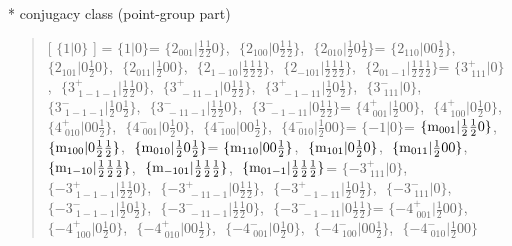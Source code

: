 \documentclass[fleqn,10pt,landscape]{jsarticle}
\begin{document}
* conjugacy class (point-group part)
\begin{quote}
[ $\{1|0\}$ ] = \quad $\{1|0\}$ = \quad $\{2{}_{001}|\frac{1}{2} \frac{1}{2} 0\}$,\,\, $\{2{}_{100}|0 \frac{1}{2} \frac{1}{2}\}$,\,\, $\{2{}_{010}|\frac{1}{2} 0 \frac{1}{2}\}$\newline[ $\{2{}_{110}|0 0 \frac{1}{2}\}$ ] = \quad $\{2{}_{110}|0 0 \frac{1}{2}\}$,\,\, $\{2{}_{101}|0 \frac{1}{2} 0\}$,\,\, $\{2{}_{011}|\frac{1}{2} 0 0\}$,\,\, $\{2{}_{1-10}|\frac{1}{2} \frac{1}{2} \frac{1}{2}\}$,\,\, $\{2{}_{-101}|\frac{1}{2} \frac{1}{2} \frac{1}{2}\}$,\,\, $\{2{}_{01-1}|\frac{1}{2} \frac{1}{2} \frac{1}{2}\}$\newline[ $\{3^{+}_{\,\,111}|0\}$ ] = \quad $\{3^{+}_{\,\,111}|0\}$,\,\, $\{3^{+}_{\,\,1-1-1}|\frac{1}{2} \frac{1}{2} 0\}$,\,\, $\{3^{+}_{\,\,-11-1}|0 \frac{1}{2} \frac{1}{2}\}$,\,\, $\{3^{+}_{\,\,-1-11}|\frac{1}{2} 0 \frac{1}{2}\}$,\,\, $\{3^{-}_{\,\,111}|0\}$,\,\, $\{3^{-}_{\,\,1-1-1}|\frac{1}{2} 0 \frac{1}{2}\}$,\,\, $\{3^{-}_{\,\,-11-1}|\frac{1}{2} \frac{1}{2} 0\}$,\,\, $\{3^{-}_{\,\,-1-11}|0 \frac{1}{2} \frac{1}{2}\}$\newline[ $\{4^{+}_{\,\,001}|\frac{1}{2} 0 0\}$ ] = \quad $\{4^{+}_{\,\,001}|\frac{1}{2} 0 0\}$,\,\, $\{4^{+}_{\,\,100}|0 \frac{1}{2} 0\}$,\,\, $\{4^{+}_{\,\,010}|0 0 \frac{1}{2}\}$,\,\, $\{4^{-}_{\,\,001}|0 \frac{1}{2} 0\}$,\,\, $\{4^{-}_{\,\,100}|0 0 \frac{1}{2}\}$,\,\, $\{4^{-}_{\,\,010}|\frac{1}{2} 0 0\}$\newline[ $\{-1|0\}$ ] = \quad $\{-1|0\}$ = \quad $\{{\rm m}_{001}|\frac{1}{2} \frac{1}{2} 0\}$,\,\, $\{{\rm m}_{100}|0 \frac{1}{2} \frac{1}{2}\}$,\,\, $\{{\rm m}_{010}|\frac{1}{2} 0 \frac{1}{2}\}$\newline[ $\{{\rm m}_{110}|0 0 \frac{1}{2}\}$ ] = \quad $\{{\rm m}_{110}|0 0 \frac{1}{2}\}$,\,\, $\{{\rm m}_{101}|0 \frac{1}{2} 0\}$,\,\, $\{{\rm m}_{011}|\frac{1}{2} 0 0\}$,\,\, $\{{\rm m}_{1-10}|\frac{1}{2} \frac{1}{2} \frac{1}{2}\}$,\,\, $\{{\rm m}_{-101}|\frac{1}{2} \frac{1}{2} \frac{1}{2}\}$,\,\, $\{{\rm m}_{01-1}|\frac{1}{2} \frac{1}{2} \frac{1}{2}\}$\newline[ $\{-3^{+}_{\,\,111}|0\}$ ] = \quad $\{-3^{+}_{\,\,111}|0\}$,\,\, $\{-3^{+}_{\,\,1-1-1}|\frac{1}{2} \frac{1}{2} 0\}$,\,\, $\{-3^{+}_{\,\,-11-1}|0 \frac{1}{2} \frac{1}{2}\}$,\,\, $\{-3^{+}_{\,\,-1-11}|\frac{1}{2} 0 \frac{1}{2}\}$,\,\, $\{-3^{-}_{\,\,111}|0\}$,\,\, $\{-3^{-}_{\,\,1-1-1}|\frac{1}{2} 0 \frac{1}{2}\}$,\,\, $\{-3^{-}_{\,\,-11-1}|\frac{1}{2} \frac{1}{2} 0\}$,\,\, $\{-3^{-}_{\,\,-1-11}|0 \frac{1}{2} \frac{1}{2}\}$\newline[ $\{-4^{+}_{\,\,001}|\frac{1}{2} 0 0\}$ ] = \quad $\{-4^{+}_{\,\,001}|\frac{1}{2} 0 0\}$,\,\, $\{-4^{+}_{\,\,100}|0 \frac{1}{2} 0\}$,\,\, $\{-4^{+}_{\,\,010}|0 0 \frac{1}{2}\}$,\,\, $\{-4^{-}_{\,\,001}|0 \frac{1}{2} 0\}$,\,\, $\{-4^{-}_{\,\,100}|0 0 \frac{1}{2}\}$,\,\, $\{-4^{-}_{\,\,010}|\frac{1}{2} 0 0\}$\newline
\end{quote}
\end{document}
